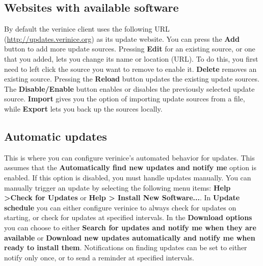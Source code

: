 \documentclass[a4paper,10pt]{book}
\begin{document}
\subsection{Websites with available software}
By default the verinice client uses the following URL (\href{http://updates.verinice.org}{http://updates.verinice.org})
as its update website. You can press the \textbf{Add} button to add more update sources.
Pressing \textbf{Edit} for an existing source, or one that you added, lets you change its name or location (URL).
To do this, you first need to left click the source you want to remove to enable it. \textbf{Delete} removes an existing source.
Pressing the \textbf{Reload} button updates the existing update sources. The \textbf{Disable/Enable} button enables
or disables the previously selected update source. \textbf{Import} gives you the option of importing update sources from a
file, while \textbf{Export} lets you back up the sources locally.

\subsection{Automatic updates}
This is where you can configure verinice's automated behavior for updates. This assumes that the
\textbf{Automatically find new updates and notify me} option is enabled. If this option is disabled, you must handle updates manually.
You can manually trigger an update by selecting the following menu items: \textbf{Help \textgreater Check for Updates} or \textbf{Help \textgreater
Install New Software...}. In \textbf{Update schedule} you can either configure verinice to always check for updates on starting,
or check for updates at specified intervals. In the \textbf{Download options} you can choose to either
\textbf{Search for updates and notify me when they are available} or \textbf{Download new updates automatically and notify me when ready to install them}.
Notifications on finding updates can be set to either notify only once, or to send a reminder at specified intervals.
\end{document}

